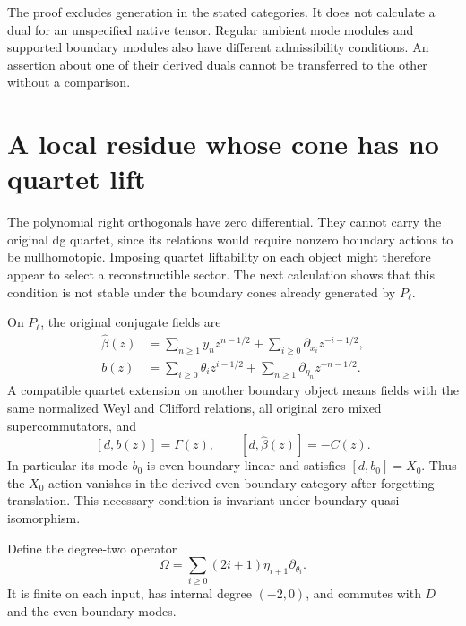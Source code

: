 The proof excludes generation in the stated categories.
It does not calculate a dual for an unspecified native tensor.
Regular ambient mode modules and supported boundary modules
also have different admissibility conditions. An assertion
about one of their derived duals cannot be transferred to the
other without a comparison.

\section{A local residue whose cone has no quartet lift}
\label{sec:vol2-quartet-cone}

The polynomial right orthogonals have zero differential.
They cannot carry the original dg quartet, since its relations
would require nonzero boundary actions to be nullhomotopic.
Imposing quartet liftability on each object might therefore
appear to select a reconstructible sector. The next calculation
shows that this condition is not stable under the boundary
cones already generated by \(P_\ell\).

On \(P_\ell\), the original conjugate fields are
\[
 \begin{aligned}
 \widehat\beta(z)&=\sum_{n\ge1}y_nz^{n-1/2}
                     +\sum_{i\ge0}\partial_{x_i}z^{-i-1/2},\\
 b(z)&=\sum_{i\ge0}\theta_i z^{i-1/2}
                     +\sum_{n\ge1}\partial_{\eta_n}z^{-n-1/2}.
 \end{aligned}
\]
A compatible quartet extension on another boundary object means
fields with the same normalized Weyl and Clifford relations,
all original zero mixed supercommutators, and
\[
 [d,b(z)]=\Gamma(z),\qquad [d,\widehat\beta(z)]=-C(z).
\]
In particular its mode \(b_0\) is even-boundary-linear and
satisfies \([d,b_0]=X_0\). Thus the \(X_0\)-action vanishes
in the derived even-boundary category after forgetting
translation. This necessary condition is invariant under
boundary quasi-isomorphism.

Define the degree-two operator
\begin{equation}\label{eq:vol2-ramond-residue}
 \Omega=\sum_{i\ge0}(2i+1)\eta_{i+1}\partial_{\theta_i}.
\end{equation}
It is finite on each input, has internal degree \((-2,0)\),
and commutes with \(D\) and the even boundary modes.

